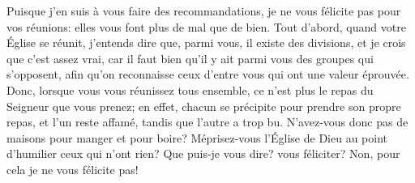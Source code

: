Puisque j’en suis à vous faire des recommandations,
	je ne vous félicite pas pour vos réunions:
	elles vous font plus de mal que de bien.
Tout d’abord, quand votre Église se réunit,
	j’entends dire que, parmi vous, il existe des divisions,
	et je crois que c’est assez vrai,
	car il faut bien qu’il y ait parmi vous des groupes qui s’opposent,
	afin qu’on reconnaisse ceux d’entre vous qui ont une valeur éprouvée.
Donc, lorsque vous vous réunissez tous ensemble,
	ce n’est plus le repas du Seigneur que vous prenez;
	en effet, chacun se précipite pour prendre son propre repas,
	et l’un reste affamé, tandis que l’autre a trop bu.
N’avez-vous donc pas de maisons pour manger et pour boire?
	Méprisez-vous l’Église de Dieu au point d’humilier ceux qui n’ont rien?
Que puis-je vous dire? vous féliciter?
	Non, pour cela je ne vous félicite pas!
